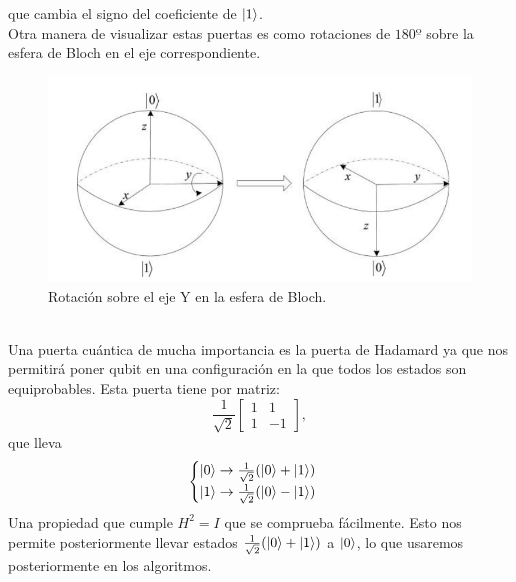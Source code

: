 \documentclass[a4paper]{article}
\numberwithin{equation}{section}
\begin{document}
que cambia el signo del coeficiente de $\ket{1}$.\\
Otra manera de visualizar estas puertas es como rotaciones de $180º$ sobre la esfera de Bloch en el eje correspondiente. \\
\begin{figure}[h]
	\centering
	\includegraphics[scale=.65]{rotacion_bloch}
	\caption{Rotación sobre el eje Y en la esfera de Bloch.}
\end{figure}\\
Una puerta cuántica de mucha importancia es la puerta de Hadamard ya que nos permitirá poner qubit en una configuración en la que todos los estados son equiprobables. Esta puerta tiene por matriz:
\begin{equation}
\frac{1}{\sqrt{2}}
\begin{bmatrix}
1 & 1 \\
1 & -1
\end{bmatrix},
\end{equation}
que lleva
\begin{equation}
\begin{cases}
\ket{0} \rightarrow \frac{1}{\sqrt{2}}(\ket{0} + \ket{1}) \\
\ket{1} \rightarrow \frac{1}{\sqrt{2}}(\ket{0} - \ket{1})
\end{cases}
\end{equation}
Una propiedad que cumple $H^2 = I$ que se comprueba fácilmente. Esto nos permite posteriormente llevar estados $\frac{1}{\sqrt{2}}(\ket{0} + \ket{1})$ a $\ket{0}$, lo que usaremos posteriormente en los algoritmos.
\end{document}
